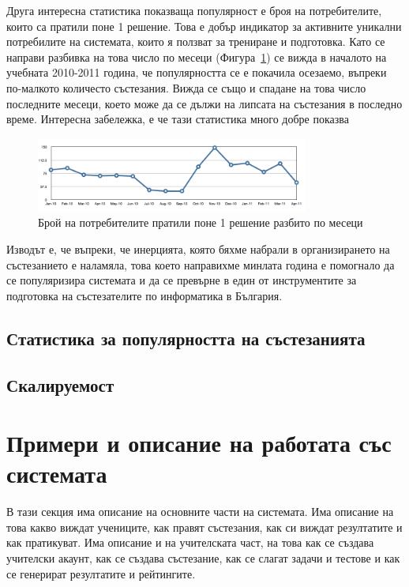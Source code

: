 \documentclass[a4paper,12pt]{article}
\begin{document}
  Друга интересна статистика показваща популярност е броя на потребителите, които са пратили поне 1 решение. Това е добър индикатор за активните уникални потребилите на системата, които я ползват за трениране и подготовка. Като се направи разбивка на това число по месеци (Фигура~\ref{submitting_users}) се вижда в началото на учебната 2010-2011 година, че популярността се е покачила осезаемо, въпреки по-малкото количесто състезания. Вижда се също и спадане на това число последните месеци, което може да се дължи на липсата на състезания в последно време. Интересна забележка, е че тази статистика много добре показва 
  
  \begin{figure}[ht]
    \begin{center}
      \includegraphics[width=0.8\textwidth]{images/submitting_users.png}
    \end{center}
    \caption{Брой на потребителите пратили поне 1 решение разбито по месеци}
    \label{submitting_users}
  \end{figure}
  
  Изводът е, че въпреки, че инерцията, която бяхме набрали в организирането на състезанието е наламяла, това което направихме минлата година е помогнало да се популяризира системата и да се превърне в един от инструментите за подготовка на състезателите по информатика в България.
  
  \subsection{Статистика за популярността на състезанията}
  \subsection{Скалируемост}

  \section{Примери и описание на работата със системата}
  В тази секция има описание на основните части на системата. Има описание на това какво виждат учениците, как правят състезания, как си виждат резултатите и как пратикуват. Има описание и на учителската част, на това как се създава учителски акаунт, как се създава състезание, как се слагат задачи и тестове и как се генерират резултатите и рейтингите.
\end{document}
